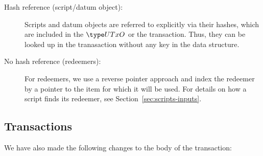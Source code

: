 \begin{description}
\item
  [Hash reference (script/datum object):]
  Scripts and datum objects are referred to explicitly via their hashes,
  which are included in the $\UTxO$ or the transaction. Thus, they can be
  looked up in the tranasaction without any key in the data structure.

  \item[No hash reference (redeemers):] For redeemers,
  we use a reverse pointer approach and
  index the redeemer by a pointer to the item for which it will be used.
  For details on how a script finds its redeemer, see Section~\ref{sec:scripts-inputs}.
\end{description}

\subsection{Transactions}
\label{sec:transctions}
We have also made the following changes to
the body of the transaction:


